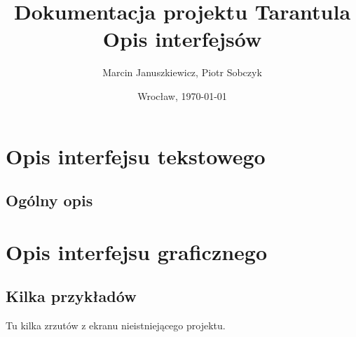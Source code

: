 \documentclass[11pt,leqno]{article}
\title{\LARGE Dokumentacja projektu \textbf{Tarantula}\\
							Opis interfejsów}
\author{Marcin Januszkiewicz, Piotr Sobczyk}
\date{Wrocław, \today}
\begin{document}
\maketitle 
\newpage
\tableofcontents
\newpage
\pagestyle{headings}

\section{Opis interfejsu tekstowego}
\subsection{Ogólny opis}


\section{Opis interfejsu graficznego}

\subsection{Kilka przykładów}
Tu kilka zrzutów z ekranu nieistniejącego projektu.
\end{document}

